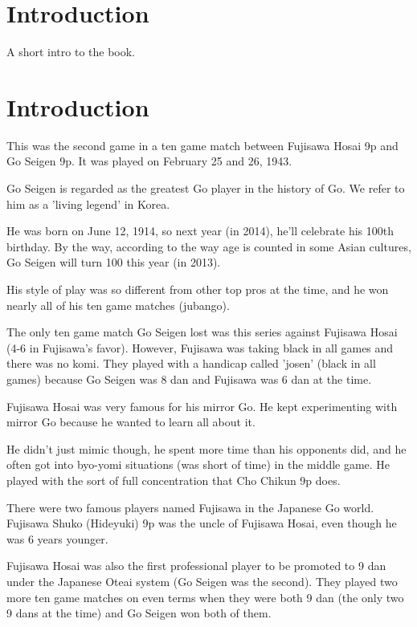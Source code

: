 \documentclass[letterpaper,12pt]{memoir}
\begin{document}
\chapter{Introduction}
A short intro to the book.



\mainmatter
\chapter{Introduction}
This was the second game in a ten game match between Fujisawa Hosai 9p and Go Seigen 9p. It was played on February 25 and 26, 1943.

Go Seigen is regarded as the greatest Go player in the history of Go. We refer to him as a 'living legend' in Korea. 

He was born on June 12, 1914, so next year (in 2014), he'll celebrate his 100th birthday. By the way, according to the way age is counted in some Asian cultures, Go Seigen will turn 100 this year (in 2013).

His style of play was so different from other top pros at the time, and he won nearly all of his ten game matches (jubango).

The only ten game match Go Seigen lost was this series against Fujisawa Hosai (4-6 in Fujisawa's favor). However, Fujisawa was taking black in all games and there was no komi. They played with a handicap called 'josen' (black in all games) because Go Seigen was 8 dan and Fujisawa was 6 dan at the time.

Fujisawa Hosai was very famous for his mirror Go. He kept experimenting with mirror Go because he wanted to learn all about it.

He didn't just mimic though, he spent more time than his opponents did, and he often got into byo-yomi situations (was short of time) in the middle game. He played with the sort of full concentration that Cho Chikun 9p does.

There were two famous players named Fujisawa in the Japanese Go world. Fujisawa Shuko (Hideyuki) 9p was the uncle of Fujisawa Hosai, even though he was 6 years younger.

Fujisawa Hosai was also the first professional player to be promoted to 9 dan under the Japanese Oteai system (Go Seigen was the second). They played two more ten game matches on even terms when they were both 9 dan (the only two 9 dans at the time) and Go Seigen won both of them.


\vfill
\end{document}

